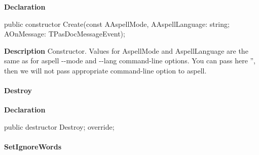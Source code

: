 \documentclass{report}
\newif\ifpdf
\begin{document}
\label{PasDoc_Aspell.TAspellProcess-Create}
\begin{list}{}{
\setlength{\itemindent}{0cm}
\setlength{\listparindent}{0cm}
\setlength{\leftmargin}{\evensidemargin}
\addtolength{\leftmargin}{\tmplength}
\settowidth{\labelsep}{X}
\addtolength{\leftmargin}{\labelsep}
\setlength{\labelwidth}{\tmplength}
}
\item[\textbf{Declaration}\hfill]
\ifpdf
\begin{flushleft}
\fi
\begin{ttfamily}
public constructor Create(const AAspellMode, AAspellLanguage: string; AOnMessage: TPasDocMessageEvent);\end{ttfamily}

\ifpdf
\end{flushleft}
\fi

\par
\item[\textbf{Description}]
Constructor. Values for AspellMode and AspellLanguage are the same as for aspell {-}{-}mode and {-}{-}lang command{-}line options. You can pass here '', then we will not pass appropriate command{-}line option to aspell.

\end{list}
\paragraph*{Destroy}\hspace*{\fill}

\label{PasDoc_Aspell.TAspellProcess-Destroy}
\begin{list}{}{
\setlength{\itemindent}{0cm}
\setlength{\listparindent}{0cm}
\setlength{\leftmargin}{\evensidemargin}
\addtolength{\leftmargin}{\tmplength}
\settowidth{\labelsep}{X}
\addtolength{\leftmargin}{\labelsep}
\setlength{\labelwidth}{\tmplength}
}
\item[\textbf{Declaration}\hfill]
\ifpdf
\begin{flushleft}
\fi
\begin{ttfamily}
public destructor Destroy; override;\end{ttfamily}

\ifpdf
\end{flushleft}
\fi

\end{list}
\paragraph*{SetIgnoreWords}\hspace*{\fill}
\end{document}
